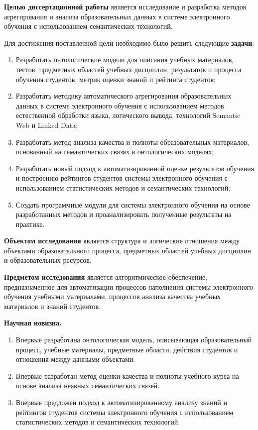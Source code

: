 \textbf{Целью диссертационной работы} является исследование и разработка методов агрегирования и анализа образовательных данных в системе электронного обучения с использованием семантических технологий.

Для достижения поставленной цели необходимо было решить следующие \textbf{задачи}:
\begin{enumerate}
 \item Разработать онтологические модели для описания учебных материалов, тестов, предметных областей учебных дисциплин, результатов и процесса обучения студентов, метрик оценки знаний и рейтинга студентов;
 \item Разработать методику автоматического агрегирования образовательных данных в системе электронного обучения с использованием методов естественной обработки языка, логического вывода, технологий Semantic Web и Linked Data;
 \item Разработать метод анализа качества и полноты образовательных материалов, основанный на семантических связях в онтологических моделях;
  \item Разработать новый подход к автоматизированной оценке результатов обучения и построению рейтингов студентов системы электронного обучения с использованием статистических методов и семантических технологий;
  \item Создать программные модули для системы электронного обучения на основе разработанных методов и проанализировать полученные результаты на практике.  
 \end{enumerate}

\textbf{Объектом исследования} является структура и логические отношения между объектами образовательного процесса, предметных областей учебных дисциплин и образовательных ресурсов.  

\textbf{Предметом исследования} является алгоритмическое обеспечение, предназначенное для автоматизации процессов наполнения системы электронного обучения учебными материалами, процессов анализа качества учебных материалов и знаний студентов. 

\textbf{Научная новизна.}
\begin{enumerate}
 \item Впервые разработана онтологическая модель, описывающая образовательный процесс, учебные материалы, предметные области, действия студентов и отношения между данными объектами. 
 \item Впервые разработан метод оценки качества и полноты учебного курса на основе анализа неявных семантических связей.
 \item Впервые предложен подход к автоматизированному анализу знаний и рейтингов студентов системы электронного обучения с использованием статистических методов и семантических технологий.
\end{enumerate}

